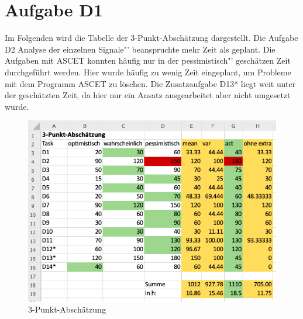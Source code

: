 \chapter{Aufgabe D1}
Im Folgenden wird die Tabelle der 3-Punkt-Abschätzung dargestellt. Die Aufgabe D2 \glqq Analyse der einzelnen Signale"' beanspruchte mehr Zeit als geplant. Die Aufgaben mit ASCET konnten häufig nur in der \glqq pessimistisch"' geschätzen Zeit durchgeführt werden. Hier wurde häufig zu wenig Zeit eingeplant, um Probleme mit dem Programm ASCET zu löschen. Die Zusatzaufgabe D13* liegt weit unter der geschätzten Zeit, da hier nur ein Ansatz ausgearbeitet aber nicht umgesetzt wurde.\\

\begin{figure}[h!]
	\centering
	\includegraphics[width=1\linewidth]{../Graphiken/Schaetzung.png}
	\caption{3-Punkt-Abschätzung}
	\label{fig:schaetzung}
\end{figure}